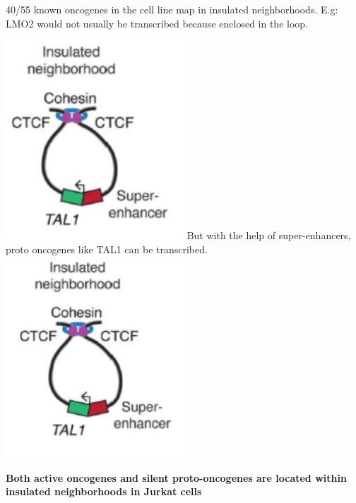 40/55 known oncogenes in the cell line map in insulated neighborhoods.
E.g: LMO2 would not usually be transcribed because enclosed in the loop.
\includegraphics[width=0.5\textwidth]{../_resources/5843fc777ea1c41b8428ead29437d8dd.png}
But with the help of super-enhancers, proto oncogenes like TAL1 can be transcribed.
\includegraphics[width=0.5\textwidth]{../_resources/cb401de7a7d48b23211a6805d8eb892b.png}

\textbf{Both active oncogenes and silent proto-oncogenes are located within insulated
neighborhoods in Jurkat cells}

